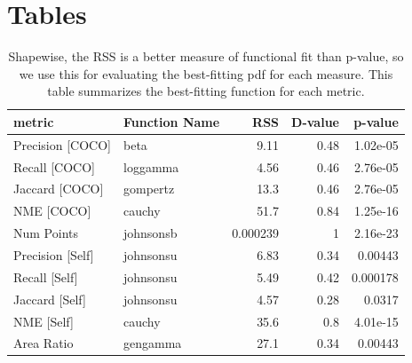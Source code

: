 \documentclass[12pt]{article}
\begin{document}
\section{Tables}
\begin{table}[ht]
\centering
\begin{tabular}{llrrr}
\hline
 metric           & Function Name   &       RSS &   D-value &   p-value \\
\hline
 Precision [COCO] & beta            &  9.11     &      0.48 &  1.02e-05 \\
 Recall [COCO]    & loggamma        &  4.56     &      0.46 &  2.76e-05 \\
 Jaccard [COCO]   & gompertz        & 13.3      &      0.46 &  2.76e-05 \\
 NME [COCO]       & cauchy          & 51.7      &      0.84 &  1.25e-16 \\
 Num Points       & johnsonsb       &  0.000239 &      1    &  2.16e-23 \\
 Precision [Self] & johnsonsu       &  6.83     &      0.34 &  0.00443  \\
 Recall [Self]    & johnsonsu       &  5.49     &      0.42 &  0.000178 \\
 Jaccard [Self]   & johnsonsu       &  4.57     &      0.28 &  0.0317   \\
 NME [Self]       & cauchy          & 35.6      &      0.8  &  4.01e-15 \\
 Area Ratio       & gengamma        & 27.1      &      0.34 &  0.00443  \\
\hline
\end{tabular}
\caption{Shapewise, the RSS is a better measure of functional fit than p-value, so we use this for evaluating the best-fitting pdf for each measure. This table summarizes the best-fitting function for each metric.}
\label{overall_best_fits}
\end{table}
\end{document}
